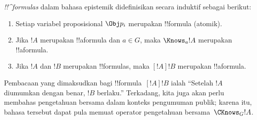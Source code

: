 \documentclass[../../../include/open-logic-section]{subfiles}
\begin{document}
\begin{defn}
  \emph{!!^{formula}s} dalam bahasa epistemik didefinisikan secara induktif
  sebagai berikut:
  \begin{enumerate}


  \item Setiap variabel proposisional $\Obj p_i$ merupakan !!{formula}
    (atomik).






  \item Jika $!A$ merupakan !!a{formula} dan $a\in G$, maka $\Knows_a !A$
    merupakan !!a{formula}.

  \item Jika $!A$ dan $!B$ merupakan !!{formula}s, maka $[!A] !B$ merupakan
    !!a{formula}.

\end{enumerate}
\end{defn}

Pembacaan yang dimaksudkan bagi !!{formula}~$[!A] !B$ ialah ``Setelah $!A$
diumumkan dengan benar, $!B$ berlaku.'' Terkadang, kita juga akan perlu
membahas pengetahuan bersama dalam konteks pengumuman publik; karena itu,
bahasa tersebut dapat pula memuat operator pengetahuan bersama~$\CKnows_G
!A$.
\end{document}
